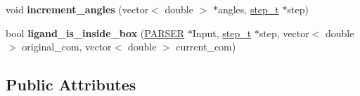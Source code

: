 \begin{DoxyCompactItemize}
\item 
\hypertarget{classMC_aae2290a5ddec7c4fae6d1f9a7682edf3}{
void {\bfseries increment\_\-angles} (vector$<$ double $>$ $\ast$angles, \hyperlink{structMC_1_1step__t}{step\_\-t} $\ast$step)}
\label{classMC_aae2290a5ddec7c4fae6d1f9a7682edf3}

\item 
\hypertarget{classMC_a6608f980b52691b51642857c3a625cdf}{
bool {\bfseries ligand\_\-is\_\-inside\_\-box} (\hyperlink{classPARSER}{PARSER} $\ast$Input, \hyperlink{structMC_1_1step__t}{step\_\-t} $\ast$step, vector$<$ double $>$ original\_\-com, vector$<$ double $>$ current\_\-com)}
\label{classMC_a6608f980b52691b51642857c3a625cdf}

\end{DoxyCompactItemize}
\subsection*{Public Attributes}
